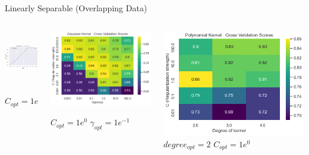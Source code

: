 \documentclass[12pt,t]{beamer}
\begin{document}
\begin{frame}[t]{Linearly Separable (Overlapping Data)}
\begin{columns}[]
        \begin{column}[]{0.30\linewidth}
            \includegraphics[width=\linewidth,height=90px]{images/p1a/1/l1.png}
            
             \centering $C_{opt} =1e^{-1}$
        \end{column}
        \begin{column}[]{0.40\linewidth}
            \includegraphics[width=\linewidth]{images/p1a/1/h1.png}
           

            \centering $C_{opt} = 1e^{0}$ 
            \centering $\gamma _{opt} = 1e^{-1}$
        \end{column}
        \begin{column}[]{0.40\linewidth}
            \includegraphics[width=\linewidth]{images/p1a/1/h2.png}
            \centering $degree_{opt} = 2$ 
            \centering $C_{opt} = 1e^{0}$
        \end{column}
    \end{columns}
\end{frame}
\end{document}
